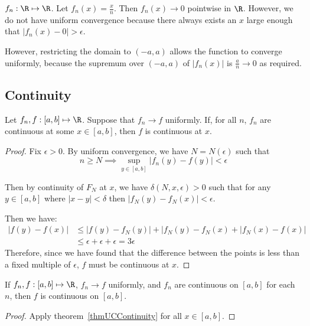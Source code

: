 \documentclass[../Main.tex]{subfiles}
\begin{document}
\begin{example}
    $f_n : \R \mapsto \R$. Let $f_n(x) = \frac{x}{n}$. Then $f_n(x) \to 0$ pointwise in $\R$. However, we do not have uniform convergence because there always exists an $x$ large enough that $|f_n(x) - 0| > \epsilon$.

    However, restricting the domain to $(-a, a)$ allows the function to converge uniformly, because the supremum over $(-a, a)$ of $|f_n(x)|$ is $\frac{a}{n} \to 0$ as required.
\end{example}
\subsection{Continuity}
\begin{theorem}
    Let $f_n, f : [a, b] \mapsto \R$. Suppose that $f_n \to f$ uniformly. If, for all $n$, $f_n$ are continuous at some $x \in [a, b]$, then $f$ is continuous at $x$.
    \label{thmUCContinuity}
\end{theorem}
\begin{proof}
    Fix $\epsilon > 0$. By uniform convergence, we have $N = N(\epsilon)$ such that
    \begin{equation*}
        n \geq N \implies \sup_{y \in [a, b]} |f_n(y) - f(y)| < \epsilon
    \end{equation*}

    Then by continuity of $F_N$ at $x$, we have $\delta(N, x, \epsilon) > 0$ such that for any $y \in [a, b]$ where $|x - y| < \delta$ then $|f_N(y) - f_N(x)| < \epsilon$.
    
    Then we have:
    \begin{align*}
        |f(y) - f(x)| &\leq |f(y) - f_N(y)| + |f_N(y) - f_N(x) + |f_N(x) - f(x)| \\
        &\leq \epsilon + \epsilon + \epsilon = 3\epsilon
    \end{align*}
    Therefore, since we have found that the difference between the points is less than a fixed multiple of $\epsilon$, $f$ must be continuous at $x$.
\end{proof}
\begin{corollary}
    If $f_n, f : [a, b] \mapsto \R$, $f_n \to f$ uniformly, and $f_n$ are continuous on $[a, b]$ for each $n$, then $f$ is continuous on $[a, b]$.
    \label{corLimitCtsUC}
\end{corollary}
\begin{proof}
    Apply theorem~\ref{thmUCContinuity} for all $x \in [a, b]$.
\end{proof}
\end{document}

